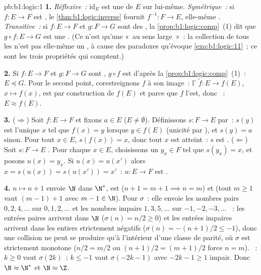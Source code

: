 \begin{solution}{pb:b1:logic:1}
\textbf{1.} \emph{Réflexive~:} $\mathrm{id}_E$ est une  de $E$
sur lui-même. \emph{Symétrique~:} si $f \colon E \to F$ est ,
le \cref{thm:b1:logic:inverse} fournit $f^{-1} \colon F \to E$, elle-même
. \emph{Transitive~:} si $f \colon E \to F$ et $g \colon F
\to G$ sont des , la \cref{prop:b1:logic:comp}~(1) dit que
$g \circ f \colon E \to G$ est une . (Ce n'est qu'une
 «~au sens large~»~: la collection de tous les
 n'est pas elle-même un , à cause des paradoxes
qu'évoque \cref{exo:b1:logic:11}~; ce sont les trois propriétés qui
comptent.)

\textbf{2.} Si $f \colon E \to F$ et $g \colon F \to G$ sont
, $g \circ f$ est  d'après
la \cref{prop:b1:logic:comp}~(1)~: $E \preceq G$. Pour le second point,
corestreignons $f$ à son image~: l' $\tilde f \colon E \to
f(E)$, $x \mapsto f(x)$, est  par construction de $f(E)$ et
 parce que $f$ l'est, donc ~: $E \approx f(E)$.

\textbf{3.} ($\Rightarrow$) Soit $f \colon E \to F$  et fixons
$a \in E$ ($E \neq \emptyset$). Définissons $s \colon F \to E$ par~:
$s(y)$ est l'unique $x$ tel que $f(x) = y$ lorsque $y \in f(E)$
(unicité par ), et $s(y) = a$ sinon. Pour tout $x \in E$,
$s(f(x)) = x$, donc tout $x$ est atteint~: $s$ est .
($\Leftarrow$) Soit $s \colon F \to E$ . Pour chaque $x \in
E$, choisissons un $y_x \in F$ tel que $s(y_x) = x$, et posons
$u(x) = y_x$. Si $u(x) = u(x')$ alors $x = s(u(x)) = s(u(x')) = x'$~:
$u \colon E \to F$ est .

\textbf{4.} $n \mapsto n + 1$ envoie $\N$ dans $\N^*$, est 
($n + 1 = m + 1 \implies n = m$) et  (tout $m \geq 1$ vaut
$(m - 1) + 1$ avec $m - 1 \in \N$). Pour $\sigma$~: elle envoie les
nombres pairs $0, 2, 4, \dots$ sur $0, 1, 2, \dots$ et les nombres
impairs $1, 3, 5, \dots$ sur $-1, -2, -3, \dots$ ~: les
entrées paires arrivent dans $\N$ ($\sigma(n) = n/2 \geq 0$) et les
entrées impaires arrivent dans les entiers strictement négatifs
($\sigma(n) = -(n+1)/2 \leq -1$), donc une collision ne peut se
produire qu'à l'intérieur d'une classe de parité, où $\sigma$ est
strictement monotone ($n/2 = m/2$ ou $(n+1)/2 = (m+1)/2$ force
$n = m$). ~: $k \geq 0$ vaut $\sigma(2k)$~; $k \leq -1$
vaut $\sigma(-2k - 1)$ avec $-2k - 1 \geq 1$ impair. Donc $\N \approx
\N^*$ et $\N \approx \Z$.


\end{solution}
